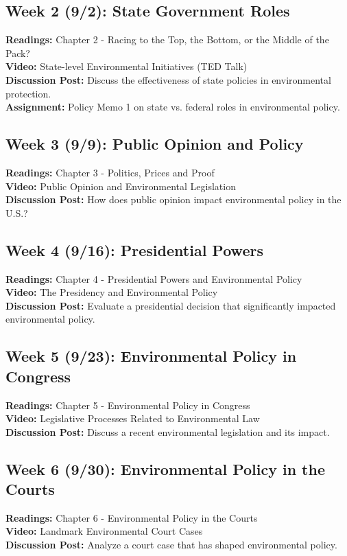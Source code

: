 \documentclass[12pt, letterpaper]{article}
\begin{document}
\subsection*{Week 2 (9/2): State Government Roles}
\textbf{Readings:} Chapter 2 - Racing to the Top, the Bottom, or the Middle of the Pack?\\
\textbf{Video:} State-level Environmental Initiatives (TED Talk)\\
\textbf{Discussion Post:} Discuss the effectiveness of state policies in environmental protection.\\
\textbf{Assignment:} Policy Memo 1 on state vs. federal roles in environmental policy.

\subsection*{Week 3 (9/9): Public Opinion and Policy}
\textbf{Readings:} Chapter 3 - Politics, Prices and Proof\\
\textbf{Video:} Public Opinion and Environmental Legislation\\
\textbf{Discussion Post:} How does public opinion impact environmental policy in the U.S.?

\subsection*{Week 4 (9/16): Presidential Powers}
\textbf{Readings:} Chapter 4 - Presidential Powers and Environmental Policy\\
\textbf{Video:} The Presidency and Environmental Policy\\
\textbf{Discussion Post:} Evaluate a presidential decision that significantly impacted environmental policy.

\subsection*{Week 5 (9/23): Environmental Policy in Congress}
\textbf{Readings:} Chapter 5 - Environmental Policy in Congress\\
\textbf{Video:} Legislative Processes Related to Environmental Law\\
\textbf{Discussion Post:} Discuss a recent environmental legislation and its impact.

\subsection*{Week 6 (9/30): Environmental Policy in the Courts}
\textbf{Readings:} Chapter 6 - Environmental Policy in the Courts\\
\textbf{Video:} Landmark Environmental Court Cases\\
\textbf{Discussion Post:} Analyze a court case that has shaped environmental policy.
\end{document}
